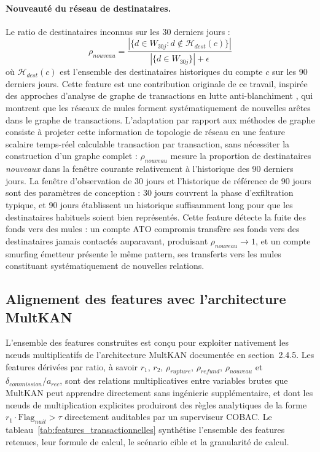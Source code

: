 \documentclass[11pt,a4paper,oneside]{report}
\theoremstyle{definition}
\theoremstyle{remark}
\begin{document}
\paragraph{Nouveauté du réseau de destinataires.}
Le ratio de destinataires inconnus sur les 30 derniers jours :
\begin{equation}
    \rho_{nouveau} = \frac{|\{d \in W_{30j} : d \notin \mathcal{H}_{dest}(c)\}|}{|\{d \in W_{30j}\}| + \epsilon}
\end{equation}
où $\mathcal{H}_{dest}(c)$ est l'ensemble des destinataires historiques du compte $c$ sur les 90 derniers jours. Cette feature est une contribution originale de ce travail, inspirée des approches d'analyse de graphe de transactions en lutte anti-blanchiment \citep{deprez2025gargaml}, qui montrent que les réseaux de mules forment systématiquement de nouvelles arêtes dans le graphe de transactions. L'adaptation par rapport aux méthodes de graphe consiste à projeter cette information de topologie de réseau en une feature scalaire temps-réel calculable transaction par transaction, sans nécessiter la construction d'un graphe complet : $\rho_{nouveau}$ mesure la proportion de destinataires \emph{nouveaux} dans la fenêtre courante relativement à l'historique des 90 derniers jours. La fenêtre d'observation de 30 jours et l'historique de référence de 90 jours sont des paramètres de conception : 30 jours couvrent la phase d'exfiltration typique, et 90 jours établissent un historique suffisamment long pour que les destinataires habituels soient bien représentés. Cette feature détecte la fuite des fonds vers des mules : un compte ATO compromis transfère ses fonds vers des destinataires jamais contactés auparavant, produisant $\rho_{nouveau} \rightarrow 1$, et un compte smurfing émetteur présente le même pattern, ses transferts vers les mules constituant systématiquement de nouvelles relations.

\subsection{Alignement des features avec l'architecture MultKAN}

L'ensemble des features construites est conçu pour exploiter nativement les nœuds multiplicatifs de l'architecture MultKAN documentée en section~2.4.5. Les features dérivées par ratio, à savoir $r_1$, $r_2$, $\rho_{rupture}$, $\rho_{refund}$, $\rho_{nouveau}$ et $\delta_{commission}/a_{rec}$, sont des relations multiplicatives entre variables brutes que MultKAN peut apprendre directement sans ingénierie supplémentaire, et dont les nœuds de multiplication explicites produiront des règles analytiques de la forme $r_1 \cdot \text{Flag}_{nuit} > \tau$ directement auditables par un superviseur COBAC. Le tableau~\ref{tab:features_transactionnelles} synthétise l'ensemble des features retenues, leur formule de calcul, le scénario cible et la granularité de calcul.
\end{document}
